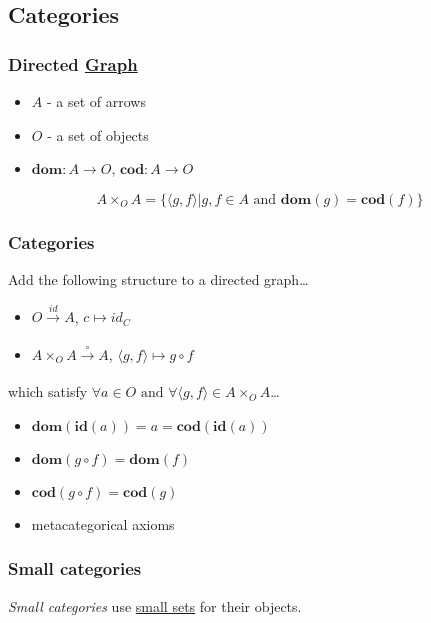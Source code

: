 \subsection{Categories}\label{category}

\subsubsection{Directed \hyperref[graph]{Graph}}\label{directedgraph}
\begin{itemize}
  \item $A$ - a set of arrows
  \item $O$ - a set of objects
  \item $\textbf{dom}: A \rightarrow O$, $\textbf{cod}: A \rightarrow O$
\end{itemize} 

\label{composablepairsofarrows}
$$A \times_O A = \{ \langle g, f \rangle | g, f \in A \textrm{ and } \textbf{dom} (g) = \textbf{cod} (f) \}$$

\subsubsection{Categories}\label{categorydefinition}
Add the following structure to a directed graph\dots
\begin{itemize}
  \item $O \xrightarrow[]{id} A$, $c \mapsto id_C$
  \item $A \times_O A \xrightarrow[]{\circ} A$, $\langle g, f \rangle \mapsto g \circ f$
\end{itemize}
which satisfy $\forall a \in O \textrm{ and } \forall \langle g, f \rangle \in A \times_O A$\dots
\begin{itemize}
  \item $\textbf{dom}(\textbf{id}(a)) = a = \textbf{cod}(\textbf{id}(a))$
  \item $\textbf{dom}(g \circ f) = \textbf{dom}(f)$
  \item $\textbf{cod}(g \circ f) = \textbf{cod}(g)$
  \item metacategorical axioms
\end{itemize}

\subsubsection{Small categories}\label{smallcategories}
\emph{Small categories} use \hyperref[smallsets]{small sets} for their objects.

